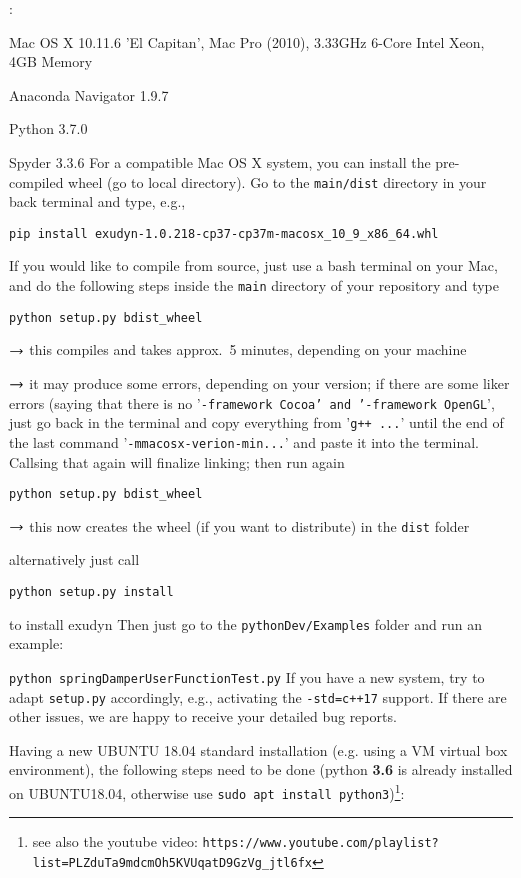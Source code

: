 :
\bi
  \item Mac OS X 10.11.6 'El Capitan', Mac Pro (2010), 3.33GHz 6-Core Intel Xeon, 4GB Memory
  \item Anaconda Navigator 1.9.7
	\item Python 3.7.0
	\item Spyder 3.3.6
\ei
For a compatible Mac OS X system, you can install the pre-compiled wheel (go to local directory). Go to the \texttt{main/dist} directory in your back terminal and type, e.g.,
\bi
\item[] \texttt{pip install exudyn-1.0.218-cp37-cp37m-macosx\_10\_9\_x86\_64.whl} \vspace{9pt}\\
\ei

If you would like to compile from source, just use a bash terminal on your Mac, and do the following steps inside the \texttt{main} directory of your repository and type
\bi
  \item \texttt{python setup.py bdist\_wheel}
	\item[] $\rightarrow$ this compiles and takes approx.~5 minutes, depending on your machine
	\item[] $\rightarrow$ it may produce some errors, depending on your version; if there are some liker errors (saying that there is no '\texttt{-framework Cocoa' and '-framework OpenGL}', just go back in the terminal and copy everything from '\texttt{g++ ...}' until the end of the last command '\texttt{-mmacosx-verion-min...}' and paste it into the terminal. Callsing that again will finalize linking; then run again
	\item[] \texttt{python setup.py bdist\_wheel}
	\item[] $\rightarrow$ this now creates the wheel (if you want to distribute) in the \texttt{dist} folder
	\item[] alternatively just call
	\item \texttt{python setup.py install}
	\item[] to install exudyn
\ei
Then just go to the \texttt{pythonDev/Examples} folder and run an example:
\bi
  \item[] \texttt{python springDamperUserFunctionTest.py}
\ei
If you have a new system, try to adapt \texttt{setup.py} accordingly, e.g., activating the \texttt{-std=c++17} support.
If there are other issues, we are happy to receive your detailed bug reports. 

\label{sec:build:ubuntu}
Having a new UBUNTU 18.04 standard installation (e.g. using a VM virtual box environment), the following steps need to be done (python {\bf 3.6} is already installed on UBUNTU18.04, otherwise use \texttt{sudo apt install python3})\footnote{see also the youtube video: \texttt{https://www.youtube.com/playlist?list=PLZduTa9mdcmOh5KVUqatD9GzVg\_jtl6fx}}:

